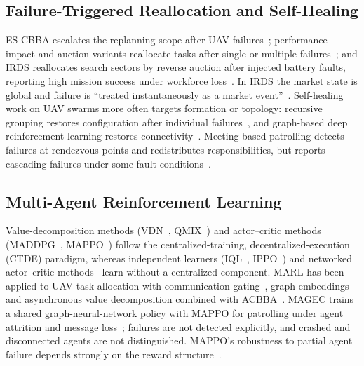 \documentclass[journal]{IEEEtran}
\begin{document}
\subsection{Failure-Triggered Reallocation and Self-Healing}
ES-CBBA escalates the replanning scope after UAV failures~\cite{R35_bai2026}; performance-impact and auction variants reallocate tasks after single or multiple failures~\cite{R36_wang2023,R37_sun2025}; and IRDS reallocates search sectors by reverse auction after injected battery faults, reporting high mission success under workforce loss~\cite{R67_giacomossi2026}. In IRDS the market state is global and failure is ``treated instantaneously as a market event''~\cite{R67_giacomossi2026}. Self-healing work on UAV swarms more often targets formation or topology: recursive grouping restores configuration after individual failures~\cite{R38_pan2025}, and graph-based deep reinforcement learning restores connectivity~\cite{R39_wang2025}. Meeting-based patrolling detects failures at rendezvous points and redistributes responsibilities, but reports cascading failures under some fault conditions~\cite{R41_santhirasegaram2026}.

\subsection{Multi-Agent Reinforcement Learning}
Value-decomposition methods (VDN~\cite{R63_sunehag2018}, QMIX~\cite{R61_rashid2018}) and actor--critic methods (MADDPG~\cite{R64_lowe2017}, MAPPO~\cite{R62_yu2022}) follow the centralized-training, decentralized-execution (CTDE) paradigm, whereas independent learners (IQL~\cite{R75_tan1993}, IPPO~\cite{R76_witt2020}) and networked actor--critic methods~\cite{R77_zhang2018} learn without a centralized component. MARL has been applied to UAV task allocation with communication gating~\cite{R50_xiong2026}, graph embeddings~\cite{R52_ratnabala2026} and asynchronous value decomposition combined with ACBBA~\cite{R51_cao2025}. MAGEC trains a shared graph-neural-network policy with MAPPO for patrolling under agent attrition and message loss~\cite{R53_goeckner2024}; failures are not detected explicitly, and crashed and disconnected agents are not distinguished. MAPPO's robustness to partial agent failure depends strongly on the reward structure~\cite{R57_barta2025}.
\end{document}
